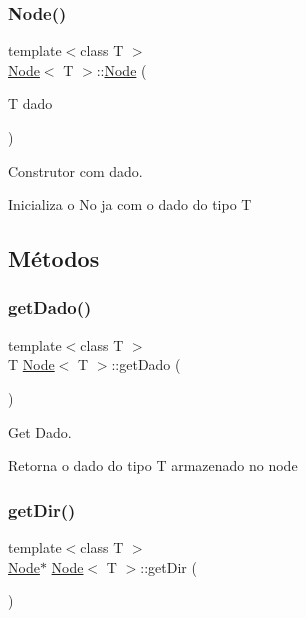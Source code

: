 \subsubsection{\texorpdfstring{Node()}{Node()}\hspace{0.1cm}{\footnotesize\ttfamily [2/2]}}
{\footnotesize\ttfamily template$<$class T $>$ \\
\hyperlink{classNode}{Node}$<$ T $>$\+::\hyperlink{classNode}{Node} (\begin{DoxyParamCaption}\item[{T}]{dado }\end{DoxyParamCaption})}



Construtor com dado. 

Inicializa o No ja com o dado do tipo T 

\subsection{Métodos}
\mbox{\label{classNode_abee48d53b678ebe2852ce6262dff8373}} 
\subsubsection{\texorpdfstring{get\+Dado()}{getDado()}}
{\footnotesize\ttfamily template$<$class T $>$ \\
T \hyperlink{classNode}{Node}$<$ T $>$\+::get\+Dado (\begin{DoxyParamCaption}{ }\end{DoxyParamCaption})}



Get Dado. 

Retorna o dado do tipo T armazenado no node \mbox{\label{classNode_aedaeaf9b013a27561cec8b27bc0a8f58}} 
\subsubsection{\texorpdfstring{get\+Dir()}{getDir()}}
{\footnotesize\ttfamily template$<$class T $>$ \\
\hyperlink{classNode}{Node}$\ast$ \hyperlink{classNode}{Node}$<$ T $>$\+::get\+Dir (\begin{DoxyParamCaption}{ }\end{DoxyParamCaption})}



